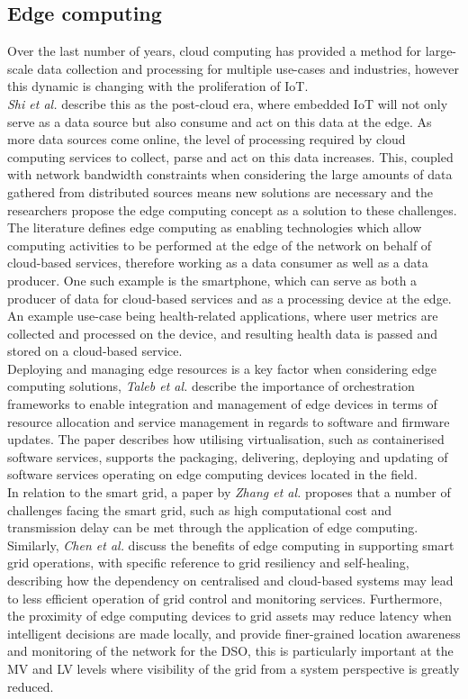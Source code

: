 \subsection{Edge computing}
\label{sec:edge_computing}

Over the last number of years, cloud computing has provided a method for large-scale data collection and processing for multiple use-cases and industries, however this dynamic is changing with the
proliferation of IoT.
\\
\textit{Shi et al.} \cite{7488250} describe this as the post-cloud era, where embedded IoT will not only serve as a data source but also consume and act on this data at the edge.
As more data sources come online, the level of processing required by cloud computing services to collect, parse and act on this data increases. This, coupled with network bandwidth constraints when
considering the large amounts of data gathered from distributed sources means new solutions are necessary and the researchers propose the edge computing concept as a solution to these challenges.
The literature defines edge computing as enabling technologies which allow computing activities to be performed at the edge of the network on behalf of cloud-based services, therefore working as a data consumer as well as a data producer.
One such example is the smartphone, which can serve as both a producer of data for cloud-based services and as a
processing device at the edge. An example use-case being health-related applications, where user metrics are collected and processed on the device, and resulting health data is passed and stored on a cloud-based service.
\\
Deploying and managing edge resources is a key factor when considering edge computing solutions, \textit{Taleb et al.} \cite{7931566} describe the importance of orchestration frameworks to enable integration and
management of edge devices in terms of resource allocation and service management in regards to software and firmware updates. The paper describes how utilising virtualisation, such as containerised software services,
supports the packaging, delivering, deploying and updating of software services operating on edge computing devices located in the field.
\\
In relation to the smart grid, a paper by \textit{Zhang et al.} \cite{9492236} proposes that a number of challenges facing the smart grid, such as high computational cost and transmission delay can be met through the
application of edge computing. Similarly, \textit{Chen et al.} \cite{8727940} discuss the benefits of edge computing in supporting smart grid operations, with specific reference to grid resiliency and self-healing, describing
how the dependency on centralised and cloud-based systems may lead to less efficient operation of grid control and monitoring services. Furthermore, the proximity of edge computing devices to grid assets may reduce latency
when intelligent decisions are made locally, and provide finer-grained location awareness and monitoring of the network for the DSO, this is particularly important at the MV and LV levels where
visibility of the grid from a system perspective is greatly reduced.

